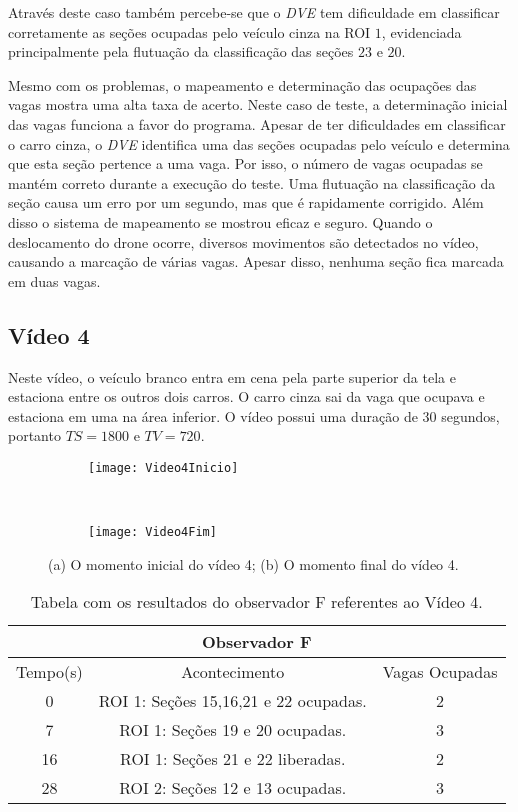 Através deste caso também percebe-se que o \textit{DVE} tem dificuldade em classificar corretamente as seções ocupadas pelo veículo cinza na ROI $1$, evidenciada principalmente pela flutuação da classificação das seções $23$ e $20$.

Mesmo com os problemas, o mapeamento e determinação das ocupações das vagas mostra uma alta taxa de acerto. Neste caso de teste, a determinação inicial das vagas funciona a favor do programa. Apesar de ter dificuldades em classificar o carro cinza, o \textit{DVE} identifica uma das seções ocupadas pelo veículo e determina que esta seção pertence a uma vaga. Por isso, o número de vagas ocupadas se mantém correto durante a execução do teste. Uma flutuação na classificação da seção causa um erro por um segundo, mas que é rapidamente corrigido. Além disso o sistema de mapeamento se mostrou eficaz e seguro. Quando o deslocamento do drone ocorre, diversos movimentos são detectados no vídeo, causando a marcação de várias vagas. Apesar disso, nenhuma seção fica marcada em duas vagas.



\subsection{Vídeo 4}

Neste vídeo, o veículo branco entra em cena pela parte superior da tela e estaciona entre os outros dois carros. O carro cinza sai da vaga que ocupava e estaciona em uma na área inferior. O vídeo possui uma duração de $30$ segundos, portanto $TS = 1800$ e $TV = 720$.

\begin{figure}[H]
\centering
\begin{subfigure}{.5\textwidth}
\centering
\texttt{[image: Video4Inicio]}
\caption{}
\end{subfigure}\
\begin{subfigure}{.5\textwidth}
\centering
\texttt{[image: Video4Fim]}
\caption{}
\end{subfigure}
\centering
\caption{(a) O momento inicial do vídeo 4; (b) O momento final do vídeo 4.}%
\label{}%
\end{figure}

\begin{table}[H]
\begin{center}
\begin{tabular}{|c||c||c|}
\hline
\multicolumn{3}{|c|}{Observador F}  \\ \hline \hline
Tempo(s) & Acontecimento & Vagas Ocupadas\\ \hline
0 & ROI 1: Seções 15,16,21 e 22 ocupadas. & 2 \\ \hline
7 & ROI 1: Seções 19 e 20 ocupadas. & 3 \\ \hline
16 & ROI 1: Seções 21 e 22 liberadas. & 2 \\ \hline
28 & ROI 2: Seções 12 e 13 ocupadas. & 3 \\
\hline
\end{tabular}
\end{center}
\caption{Tabela com os resultados do observador F referentes ao Vídeo 4.}
\label{tab:video4F}
\end{table}

